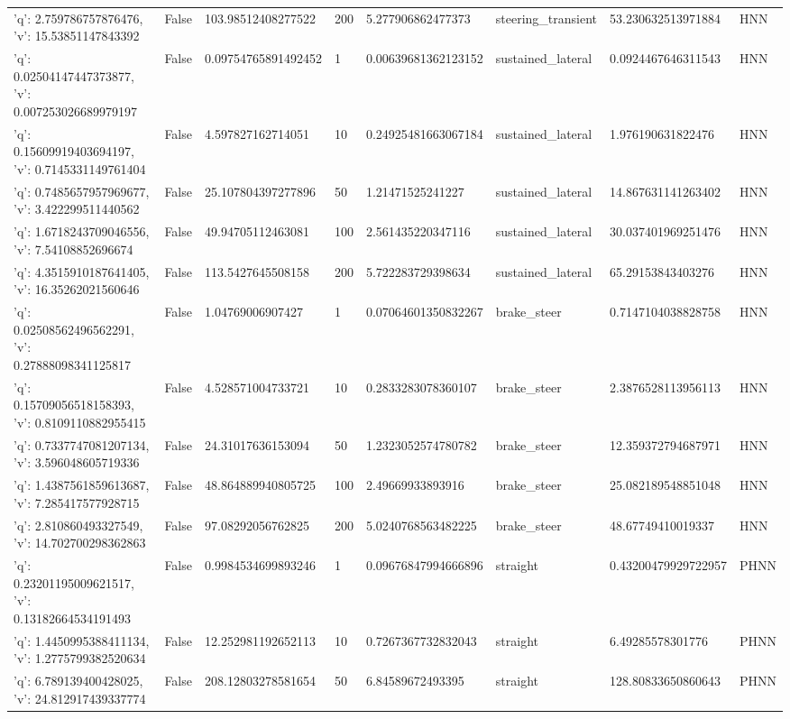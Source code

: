 \begin{tabular}{llllllll}
{'q': 2.759786757876476, 'v': 15.53851147843392} & False & 103.98512408277522 & 200 & 5.277906862477373 & steering\_transient & 53.230632513971884 & HNN \\
{'q': 0.02504147447373877, 'v': 0.007253026689979197} & False & 0.09754765891492452 & 1 & 0.00639681362123152 & sustained\_lateral & 0.0924467646311543 & HNN \\
{'q': 0.15609919403694197, 'v': 0.7145331149761404} & False & 4.597827162714051 & 10 & 0.24925481663067184 & sustained\_lateral & 1.976190631822476 & HNN \\
{'q': 0.7485657957969677, 'v': 3.422299511440562} & False & 25.107804397277896 & 50 & 1.21471525241227 & sustained\_lateral & 14.867631141263402 & HNN \\
{'q': 1.6718243709046556, 'v': 7.54108852696674} & False & 49.94705112463081 & 100 & 2.561435220347116 & sustained\_lateral & 30.037401969251476 & HNN \\
{'q': 4.3515910187641405, 'v': 16.35262021560646} & False & 113.5427645508158 & 200 & 5.722283729398634 & sustained\_lateral & 65.29153843403276 & HNN \\
{'q': 0.02508562496562291, 'v': 0.27888098341125817} & False & 1.04769006907427 & 1 & 0.07064601350832267 & brake\_steer & 0.7147104038828758 & HNN \\
{'q': 0.15709056518158393, 'v': 0.8109110882955415} & False & 4.528571004733721 & 10 & 0.2833283078360107 & brake\_steer & 2.3876528113956113 & HNN \\
{'q': 0.7337747081207134, 'v': 3.596048605719336} & False & 24.31017636153094 & 50 & 1.2323052574780782 & brake\_steer & 12.359372794687971 & HNN \\
{'q': 1.4387561859613687, 'v': 7.285417577928715} & False & 48.864889940805725 & 100 & 2.49669933893916 & brake\_steer & 25.082189548851048 & HNN \\
{'q': 2.810860493327549, 'v': 14.702700298362863} & False & 97.08292056762825 & 200 & 5.0240768563482225 & brake\_steer & 48.67749410019337 & HNN \\
{'q': 0.23201195009621517, 'v': 0.13182664534191493} & False & 0.9984534699893246 & 1 & 0.09676847994666896 & straight & 0.43200479929722957 & PHNN \\
{'q': 1.4450995388411134, 'v': 1.2775799382520634} & False & 12.252981192652113 & 10 & 0.7267367732832043 & straight & 6.49285578301776 & PHNN \\
{'q': 6.789139400428025, 'v': 24.812917439337774} & False & 208.12803278581654 & 50 & 6.84589672493395 & straight & 128.80833650860643 & PHNN \\

\end{tabular}
